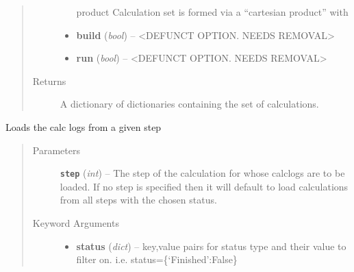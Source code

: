 \documentclass[letterpaper,10pt,english]{sphinxmanual}
\begin{document}
\begin{fulllineitems}
\begin{fulllineitems}
\begin{quote}
\begin{description}
\begin{itemize}
\begin{description}
\item[{product \textbar{} Calculation set is formed via a ``cartesian product'' with}] \leavevmode
{}

\end{description}

\item {} 
\textbf{build} (\emph{bool}) --
\textless{}DEFUNCT OPTION. NEEDS REMOVAL\textgreater{}

\item {} 
\textbf{run} (\emph{bool}) --
\textless{}DEFUNCT OPTION. NEEDS REMOVAL\textgreater{}

\end{itemize}

\item[{Returns}] \leavevmode
A dictionary of dictionaries containing the set of calculations.

\end{description}\end{quote}

\end{fulllineitems}


\begin{fulllineitems}
\label{prep:prep.init.status}
Loads the calc logs from a given step
\begin{quote}\begin{description}
\item[{Parameters}] \leavevmode
\textbf{\texttt{step}} (\emph{int}) -- The step of the calculation for whose calclogs are to be loaded.
If no step is specified then it will default to load calculations
from all steps with the chosen status.

\item[{Keyword Arguments}] \leavevmode\begin{itemize}
\item {} 
\textbf{status} (\emph{dict}) --
key,value pairs for status type and their value to filter on.
i.e. status=\{`Finished':False\}


\end{itemize}
\end{description}
\end{quote}
\end{fulllineitems}
\end{fulllineitems}
\end{document}
